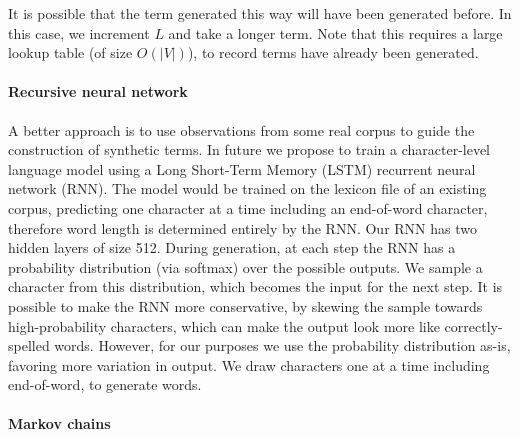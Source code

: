 \documentclass[11pt]{report}
\newcommand{\todo}[1]{{\color{blue}[[TODO: {\emph{#1}}]]}}
\begin{document}
It is possible that the term generated this way will have been
generated before. In this case, we increment $L$ and take a longer
term.  Note that this requires a large lookup table (of size
$O(|V|)$), to record terms have already been generated.

%
%


\paragraph*{Recursive neural network}

A better approach is to use observations from some real corpus to
guide the construction of synthetic terms.  In future we propose to train a
character-level language model using a Long Short-Term Memory (LSTM)
recurrent neural network
(RNN).\cite{hochreiter1997long,sutskeverMartensHinton2011generatingTraffic}
The model would be
trained on the lexicon file of an existing corpus, predicting one
character at a time including an end-of-word character, therefore word
length is determined entirely by the RNN. Our RNN has two hidden
layers of size 512. During generation, at each step the RNN has a
probability distribution (via softmax) over the possible outputs. We
sample a character from this distribution, which becomes the input for
the next step. It is possible to make the RNN more conservative, by
skewing the sample towards high-probability characters, which can make
the output look more like correctly-spelled words. However, for our
purposes we use the probability distribution as-is, favoring more
variation in output. We draw characters one at a time including
end-of-word, to generate words.



\paragraph*{Markov chains}
\end{document}
